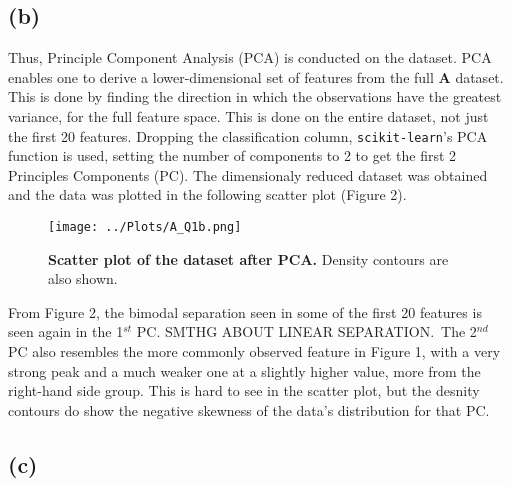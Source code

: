 \documentclass[12pt]{report} %
\begin{document}
\newpage

\subsection*{(b)}

Thus, Principle Component Analysis (PCA) is conducted on the dataset. PCA enables one to derive a lower-dimensional set of features from the full \textbf{A} dataset. This is done by finding the direction in which the observations have the greatest variance, for the full feature space\cite[pp. 255-257]{james2013introduction}. This is done on the entire dataset, not just the first 20 features. Dropping the classification column, \texttt{scikit-learn}'s PCA function is used, setting the number of components to 2 to get the first 2 Principles Components (PC). The dimensionaly reduced dataset was obtained and the data was plotted in the following scatter plot (Figure 2).

\begin{figure}[h]
    \centering
    \texttt{[image: ../Plots/A\_Q1b.png]}
    \caption{\textbf{Scatter plot of the dataset after PCA.} Density contours are also shown.}
\end{figure}

From Figure 2, the bimodal separation seen in some of the first 20 features is seen again in the 1$^{st}$ PC. SMTHG ABOUT LINEAR SEPARATION.\ The 2$^{nd}$ PC also resembles the more commonly observed feature in Figure 1, with a very strong peak and a much weaker one at a slightly higher value, more from the right-hand side group. This is hard to see in the scatter plot, but the desnity contours do show the negative skewness of the data's distribution for that PC.\

\subsection*{(c)}
\end{document}
